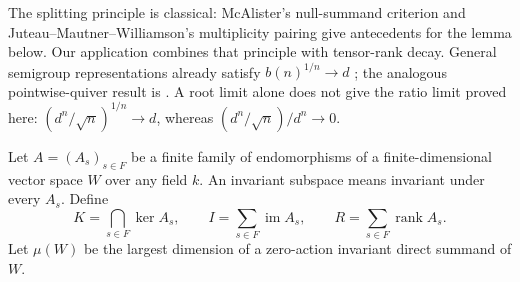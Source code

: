 \documentclass[11pt]{article}
\newcommand{\rank}{\operatorname{rank}}
\newcommand{\im}{\operatorname{im}}
\begin{document}
The splitting principle is classical: McAlister's null-summand criterion
\cite[Definition~1.4, pp.~195--196; Corollary~2.6, p.~201]{McA71}
and Juteau--Mautner--Williamson's multiplicity pairing
\cite[v1, \S3.2.1, p.~23, (3.1); v3, Lemma~3.1, pp.~22--23]{JMW}
give antecedents for the lemma below. Our application combines that principle
with tensor-rank decay. General semigroup representations already satisfy
\(b(n)^{1/n}\to d\) \cite[Theorem~1.4(a), Remark~1.5(a)]{COT}; the analogous
pointwise-quiver result is \cite[Theorem~A]{LZ}. A root limit alone does not give
the ratio limit proved here: \((d^n/\sqrt n)^{1/n}\to d\), whereas
\((d^n/\sqrt n)/d^n\to0\).

Let \(A=(A_s)_{s\in F}\) be a finite family of endomorphisms of a finite-dimensional
vector space \(W\) over any field \(k\). An invariant subspace means invariant
under every \(A_s\). Define
\[
 K=\bigcap_{s\in F}\ker A_s,\qquad
 I=\sum_{s\in F}\im A_s,\qquad R=\sum_{s\in F}\rank A_s.
\]
Let \(\mu(W)\) be the largest dimension of a zero-action invariant direct
summand of \(W\).
\end{document}
